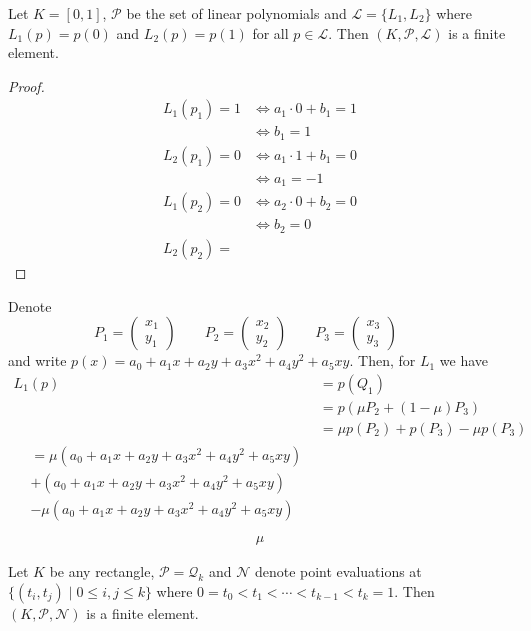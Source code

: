 \begin{example}
    Let \(K = [0, 1]\), \(\mathcal{P}\) be the set of linear polynomials and \(\mathcal{L} = \{L_1, L_2\}\) where \(L_1(p) = p(0)\) and \(L_2(p) = p(1)\) for all \(p \in \mathcal{L}\). Then \((K, \mathcal{P}, \mathcal{L})\) is a finite element.
\end{example}
\begin{proof}
    \begin{align*}
        L_1 (p_1) = 1 & \iff a_1 \cdot 0 + b_1 = 1 \\
        & \iff b_1 = 1 \\
        L_2 (p_1) = 0 & \iff a_1 \cdot 1 + b_1 = 0 \\
        & \iff a_1 = -1 \\
        L_1 (p_2) = 0 & \iff a_2 \cdot 0 + b_2 = 0 \\
        & \iff b_2 = 0 \\
        L_2 (p_2) = 
    \end{align*}
\end{proof}

\begin{example}
    Denote
    \begin{equation}
        P_1 = \begin{pmatrix}
            x_1 \\ y_1
        \end{pmatrix} \qquad
        P_2 = \begin{pmatrix}
            x_2 \\ y_2
        \end{pmatrix} \qquad
        P_3 = \begin{pmatrix}
            x_3 \\ y_3
        \end{pmatrix} \qquad
    \end{equation}
    and write \(p(x) = a_0 + a_1 x + a_2 y + a_3 x^2 + a_4 y^2 + a_5 xy\). Then, for \(L_1\) we have
    \begin{align}
        L_1 (p) &= p(Q_1) \\
        &= p(\mu P_2 + (1 - \mu)P_3) \\
        &= \mu p (P_2) + p (P_3) - \mu p (P_3) \\
        \begin{split}
            &= \mu \left( a_0 + a_1 x + a_2 y + a_3 x^2 + a_4 y^2 + a_5 xy \right) \\
            & + \left( a_0 + a_1 x + a_2 y + a_3 x^2 + a_4 y^2 + a_5 xy \right) \\
            & - \mu \left( a_0 + a_1 x + a_2 y + a_3 x^2 + a_4 y^2 + a_5 xy \right) \\
        \end{split}
    \end{align}
    \begin{align}
        \mu
    \end{align}
\end{example}

\begin{example}
    Let \(K\) be any rectangle, \(\mathcal{P} = \mathcal{Q}_k\) and \(\mathcal{N}\) denote point evaluations at \(\{(t_i, t_j) \mid 0 \leq i, j \leq k\}\) where \(0 = t_0 < t_1 < \cdots < t_{k-1} < t_k = 1\). Then \((K, \mathcal{P}, \mathcal{N})\) is a finite element.
\end{example}